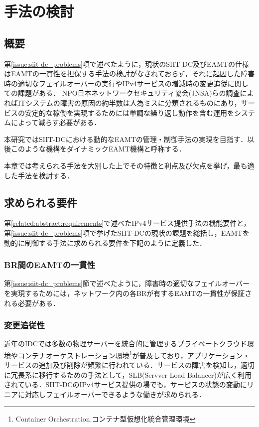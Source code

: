 \chapter{手法の検討}
\label{consideration}

\section{概要}
第\ref{issue:siit-dc_problems}項で述べたように，現状のSIIT-DC及びEAMTの仕様はEAMTの一貫性を担保する手法の検討がなされておらず，それに起因した障害時の適切なフェイルオーバーの実行やIPv4サービスの増減時の変更追従に関しての課題がある．
NPO日本ネットワークセキュリティ協会(JNSA)らの調査によればITシステムの障害の原因の約半数は人為ミスに分類されるものにあり\cite{human_error}，サービスの安定的な稼働を実現するためには単調な繰り返し動作を含む運用をシステムによって減らす必要がある．

本研究ではSIIT-DCにおける動的なEAMTの管理・制御手法の実現を目指す．以後このような機構をダイナミックEAMT機構と呼称する．

本章では考えられる手法を大別した上でその特徴と利点及び欠点を挙げ，最も適した手法を検討する．


\section{求められる要件}
\label{consideration:points}

第\ref{related:abstract:requirements}で述べたIPv4サービス提供手法の機能要件と，第\ref{issue:siit-dc_problems}項で挙げたSIIT-DCの現状の課題を総括し，EAMTを動的に制御する手法に求められる要件を下記のように定義した．

\subsection{BR間のEAMTの一貫性}
第\ref{issue:siit-dc_problems}節で述べたように，障害時の適切なフェイルオーバーを実現するためには，ネットワーク内の各BRが有するEAMTの一貫性が保証される必要がある．

\subsection{変更追従性}
近年のIDCでは多数の物理サーバーを統合的に管理するプライベートクラウド環境やコンテナオーケストレーション環境\footnote{Container Orchestration.コンテナ型仮想化統合管理環境}が普及しており，アプリケーション・サービスの追加及び削除が頻繁に行われている．サービスの障害を検知し，適切に冗長系に移行するための手法として，SLB(Servver Load Balancer)が広く利用されている．SIIT-DCのIPv4サービス提供の場でも，サービスの状態の変動にリニアに対応しフェイルオーバーできるような働きが求められる．

